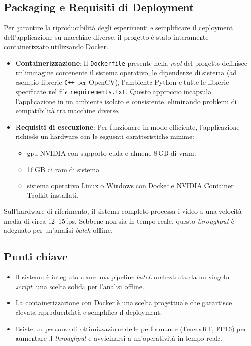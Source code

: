 \documentclass[12pt,a4paper,openright,twoside]{book}
\begin{document}
\subsection{Packaging e Requisiti di Deployment}
\label{sec:packaging-deployment}

Per garantire la riproducibilità degli esperimenti e semplificare il deployment dell'applicazione su macchine diverse, il progetto 
è stato interamente containerizzato utilizzando Docker.

\begin{itemize}
  \item \textbf{Containerizzazione}: Il \texttt{Dockerfile} presente nella \emph{root} del progetto definisce un'immagine contenente 
  il sistema operativo, le dipendenze di sistema (ad esempio librerie \texttt{C++} per OpenCV), l'ambiente Python e tutte le librerie specificate 
  nel file \texttt{requirements.txt}. 
  Questo approccio incapsula l'applicazione in un ambiente isolato e consistente, eliminando problemi di compatibilità tra macchine diverse.
  \item \textbf{Requisiti di esecuzione}: Per funzionare in modo efficiente, l'applicazione richiede un hardware con le seguenti 
  caratteristiche minime:
    \begin{itemize}
      \item \ac{gpu} NVIDIA con supporto \ac{cuda} e almeno 8\,GB di \ac{vram};
      \item 16\,GB di \ac{ram} di sistema;
      \item sistema operativo Linux o Windows con Docker e NVIDIA Container Toolkit installati.
    \end{itemize}
\end{itemize}

Sull'hardware di riferimento, il sistema completo processa i video a una velocità media di circa 12--15\,\ac{fps}. 
Sebbene non sia in tempo reale, questo \emph{throughput} è adeguato per un'analisi \emph{batch} offline.

\subsection*{Punti chiave}

\begin{itemize}
  \item Il sistema è integrato come una pipeline \emph{batch} orchestrata da un singolo \emph{script}, una scelta solida per l'analisi offline.
  \item La containerizzazione con Docker è una scelta progettuale che garantisce elevata riproducibilità e semplifica il deployment.
  \item Esiste un percorso di ottimizzazione delle performance (TensorRT, FP16) per aumentare il \emph{throughput} e avvicinarsi a un'operatività 
  in tempo reale.
\end{itemize}
\end{document}
